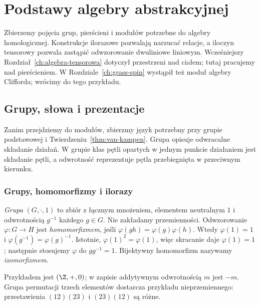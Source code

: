 \chapter{Podstawy algebry abstrakcyjnej}
\label{ch:algebra-abstrakcyjna}

Zbierzemy pojęcia grup, pierścieni i modułów potrzebne
do algebry homologicznej. Konstrukcje ilorazowe pozwalają
narzucać relacje, a iloczyn tensorowy pozwala zastąpić
odwzorowanie dwuliniowe liniowym. Wcześniejszy
Rozdział~\ref{ch:algebra-tensorowa} dotyczył przestrzeni
nad ciałem; tutaj pracujemy nad pierścieniem.
W Rozdziale~\ref{ch:grass-spin} wystąpił też moduł
algebry Clifforda; wrócimy do tego przykładu.

\section{Grupy, słowa i prezentacje}
\label{sec:grupy-prezentacje-5}

Zanim przejdziemy do modułów, zbierzmy język
potrzebny przy grupie podstawowej i
Twierdzeniu~\ref{thm:van-kampen}. Grupa opisuje
odwracalne składanie działań. W grupie klas
pętli opartych w jednym punkcie działaniem
jest składanie pętli, a odwrotność reprezentuje
pętla przebiegnięta w przeciwnym kierunku.

\subsection*{Grupy, homomorfizmy i ilorazy}

\begin{definicja}
\label{def:grupa-hom-5}
\emph{Grupa} $(G,\cdot,1)$ to zbiór z łącznym
mnożeniem, elementem neutralnym $1$ i
odwrotnością $g^{-1}$ każdego $g\in G$.
Nie zakładamy przemienności. Odwzorowanie
$\varphi:G\to H$ jest \emph{homomorfizmem},
jeśli $\varphi(gh)=\varphi(g)\varphi(h)$.
Wtedy $\varphi(1)=1$ i
$\varphi(g^{-1})=\varphi(g)^{-1}$.
Istotnie, $\varphi(1)^2=\varphi(1)$, więc skracanie daje
$\varphi(1)=1$; następnie stosujemy $\varphi$ do $gg^{-1}=1$.
Bijektywny homomorfizm nazywamy \emph{izomorfizmem}.
\end{definicja}

Przykładem jest $(\Z,+,0)$;
w zapisie addytywnym odwrotnością $m$
jest $-m$. Grupa permutacji trzech
elementów dostarcza przykładu
nieprzemiennego: przestawienia
$(12)(23)$ i $(23)(12)$ są różne.

